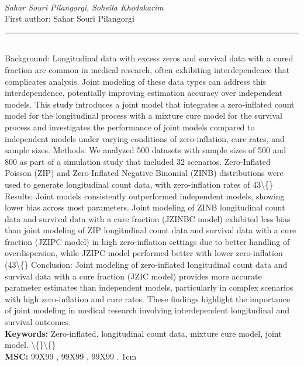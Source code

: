 \documentclass[10pt,twoside]{article}
\begin{document}
\noindent\begin{minipage}[t][\textheight]{\textwidth}
\\[0.35em]
{\itshape Sahar Souri Pilangorgi, Soheila Khodakarim}\\[0.2em]
{\footnotesize First author: Sahar Souri Pilangorgi}\\[0.45em]
\noindent\rule{\textwidth}{0.3pt}\\[0.4em]
{\footnotesize  Background: Longitudinal data with excess zeros and survival data with a cured fraction are common in medical research, often exhibiting interdependence that complicates analysis. Joint modeling of these data types can address this interdependence, potentially improving estimation accuracy over independent models. This study introduces a joint model that integrates a zero-inflated count model for the longitudinal process with a mixture cure model for the survival process and investigates the performance of joint models compared to independent models under varying conditions of zero-inflation, cure rates, and sample sizes. Methods: We analyzed 500 datasets with sample sizes of 500 and 800 as part of a simulation study that included 32 scenarios. Zero-Inflated Poisson (ZIP) and Zero-Inflated Negative Binomial (ZINB) distributions were used to generate longitudinal count data, with zero-inflation rates of 43\textbackslash\{\} Results: Joint models consistently outperformed independent models, showing lower bias across most parameters. Joint modeling of ZINB longitudinal count data and survival data with a cure fraction (JZINBC model) exhibited less bias than joint modeling of ZIP longitudinal count data and survival data with a cure fraction (JZIPC model) in high zero-inflation settings due to better handling of overdispersion, while JZIPC model performed better with lower zero-inflation (43\textbackslash\{\} Conclusion: Joint modeling of zero-inflated longitudinal count data and survival data with a cure fraction (JZIC model) provides more accurate parameter estimates than independent models, particularly in complex scenarios with high zero-inflation and cure rates. These findings highlight the importance of joint modeling in medical research involving interdependent longitudinal and survival outcomes.}\\[0.4em]
{\footnotesize\bfseries Keywords:} {\footnotesize Zero-inflated, longitudinal count data, mixture cure model, joint model. \textbackslash\{\}\textbackslash\{\}}\\[0.15em]
{\footnotesize\bfseries MSC:} {\footnotesize 99X99 , 99X99 , 99X99 . 1cm}\\
\vfill
\end{minipage}
\newpage
\end{document}
